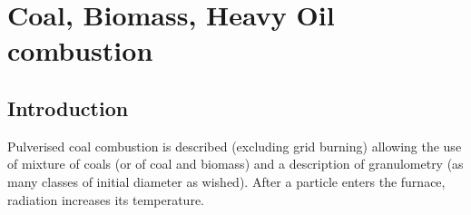 \section{Coal, Biomass, Heavy Oil combustion}

\subsection{Introduction}

Pulverised coal combustion is described (excluding grid burning) allowing the
use of mixture of coals (or of coal and biomass) and a description of
granulometry (as many classes of initial diameter as wished). After a particle
enters the furnace, radiation increases its temperature.

